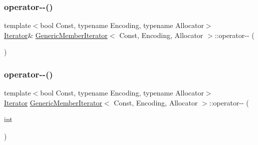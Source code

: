 \subsubsection{\texorpdfstring{operator-\/-\/()}{operator--()}\hspace{0.1cm}{\footnotesize\ttfamily [1/2]}}
{\footnotesize\ttfamily template$<$bool Const, typename Encoding, typename Allocator$>$ \\
\hyperlink{classGenericMemberIterator_ad1cf1ecf6210b47906c9f179c893a8b8}{Iterator}\& \hyperlink{classGenericMemberIterator}{Generic\+Member\+Iterator}$<$ Const, Encoding, Allocator $>$\+::operator-\/-\/ (\begin{DoxyParamCaption}{ }\end{DoxyParamCaption})\hspace{0.3cm}{\ttfamily [inline]}}

\mbox{\label{classGenericMemberIterator_a4606c8baec5ea2b5139a503f7caa5444}} 
\subsubsection{\texorpdfstring{operator-\/-\/()}{operator--()}\hspace{0.1cm}{\footnotesize\ttfamily [2/2]}}
{\footnotesize\ttfamily template$<$bool Const, typename Encoding, typename Allocator$>$ \\
\hyperlink{classGenericMemberIterator_ad1cf1ecf6210b47906c9f179c893a8b8}{Iterator} \hyperlink{classGenericMemberIterator}{Generic\+Member\+Iterator}$<$ Const, Encoding, Allocator $>$\+::operator-\/-\/ (\begin{DoxyParamCaption}\item[{int}]{ }\end{DoxyParamCaption})\hspace{0.3cm}{\ttfamily [inline]}}

\mbox{\label{classGenericMemberIterator_a7cd0c5f194007ec24fa9fa5c13e2502a}} 
